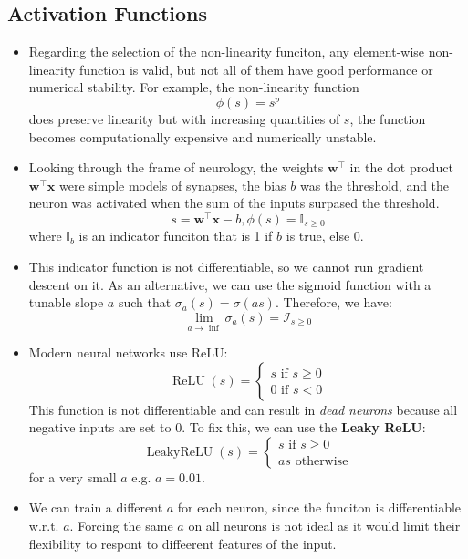 \documentclass{article}
\newcommand{\tbf}[1]{\textbf{#1}}
\newcommand{\mbf}[1]{\mathbf{#1}}
\begin{document}
        \subsection{Activation Functions}
        \begin{itemize}
            \item Regarding the selection of the non-linearity funciton, any element-wise non-linearity function is valid, but not all of them have good performance or numerical stability.
            For example, the non-linearity function
            \[\phi(s) = s^p \]
            does preserve linearity but with increasing quantities of $s$, the function becomes computationally expensive and numerically unstable.
            \item Looking through the frame of neurology, the weights $\mbf{w} ^\top$ in the dot product $\mbf{w}^\top \mbf{x}$ were simple models of synapses, the bias $b$ was the threshold, and the neuron was activated when the sum of the inputs surpased the threshold.
            \[s = \mbf{w}^\top \mbf{x} - b, \phi(s) = \mathbb{I}_{s \geq 0}\]
            where $\mathbb{I}_b$ is an indicator funciton that is 1 if $b$ is true, else 0.
            \item This indicator function is not differentiable, so we cannot run gradient descent on it. As an alternative, we can use the sigmoid function with a tunable slope $a$ such that $\sigma_a(s) = \sigma(as)$. Therefore, we have:
            \[\lim_{a \rightarrow \inf} \sigma _a (s) = \mathcal{I}_{s \geq 0}\]
            \item Modern neural networks use ReLU:
            \[ \operatorname{ReLU}(s) = 
            \begin{cases}
                s \text{ if } s \geq 0 \\
                0 \text{ if } s < 0
            \end{cases} \]
            This function is not differentiable and can result in \emph{dead neurons} because all negative inputs are set to 0. To fix this, we can use the \tbf{Leaky ReLU}:
            \[ \operatorname{LeakyReLU}(s) = 
            \begin{cases}
                s \text{ if } s \geq 0 \\
                as \text{ otherwise}
            \end{cases}\]
            for a very small $a$ e.g. $a = 0.01$.
            \item We can train a different $a$ for each neuron, since the funciton is differentiable w.r.t. $a$. Forcing the same $a$ on all neurons is not ideal as it would limit their flexibility to respont to diffeerent features of the input.

\end{itemize}
\end{document}
